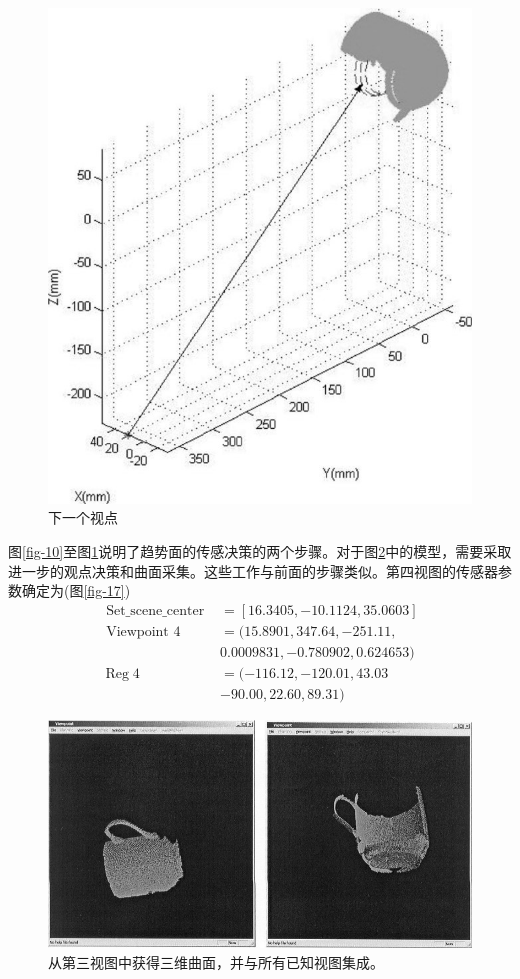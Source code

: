 \documentclass[AutoFakeBold,zihao=-4]{ctexart}
\begin{document}
	\begin{figure}[H]
		\centering
		\includegraphics[scale=0.4]{PIC15}
		\caption{下一个视点}
		\label{fig-15}
	\end{figure}
	图\ref{fig-10}至图\ref{fig-15}说明了趋势面的传感决策的两个步骤。对于图\ref{fig-16}中的模型，需要采取进一步的观点决策和曲面采集。这些工作与前面的步骤类似。第四视图的传感器参数确定为(图\ref{fig-17})
	\begin{equation*}
		\begin{aligned}
			\text { Set\_scene\_center }&=[16.3405,-10.1124,35.0603] \\
			\text { Viewpoint } 4&=(15.8901,347.64,-251.11,\\
			&0.0009831,-0.780902,0.624653) \\
			\operatorname{Reg} 4&=(-116.12,-120.01,43.03\\
			&-90.00,22.60,89.31)
		\end{aligned}
	\end{equation*}
	\begin{figure}[H]
		\centering
		\includegraphics[scale=0.3]{PIC16}
		\caption{从第三视图中获得三维曲面，并与所有已知视图集成。}
		\label{fig-16}
	\end{figure}
\end{document}
